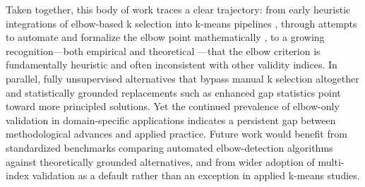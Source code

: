 Taken together, this body of work traces a clear trajectory: from early heuristic integrations of elbow-based k selection into k-means pipelines \cite{wei2013improved,syakur2018integration,umargono2020means}, through attempts to automate and formalize the elbow point mathematically \cite{shi2021quantitative,herdiana2026more}, to a growing recognition---both empirical \cite{saputra2020effect,sagala2022discovering,ashari2023analysis} and theoretical \cite{schubert2023stop}---that the elbow criterion is fundamentally heuristic and often inconsistent with other validity indices. In parallel, fully unsupervised alternatives that bypass manual k selection altogether \cite{sinaga2020unsupervised,yang2023unsupervised,gowsic2024enhanced} and statistically grounded replacements such as enhanced gap statistics \cite{khan2024addressing} point toward more principled solutions. Yet the continued prevalence of elbow-only validation in domain-specific applications \cite{sammouda2021optimized,permadi2023means,maori2023metode,ghifari2023clustering,wala2024heart,meliyana2025performance,abdillah2025implementation} indicates a persistent gap between methodological advances and applied practice. Future work would benefit from standardized benchmarks comparing automated elbow-detection algorithms against theoretically grounded alternatives, and from wider adoption of multi-index validation as a default rather than an exception in applied k-means studies.

